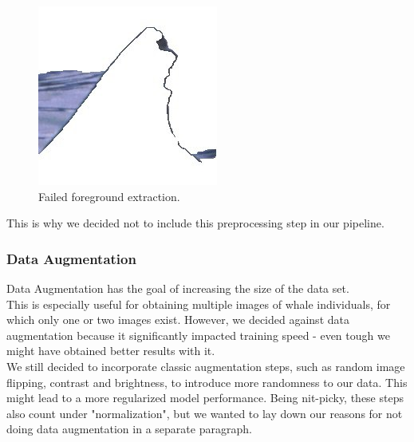 \begin{figure}[ht] 
        \centering \includegraphics[width=0.7\columnwidth]{figures/whack_foreground_extraction.jpg}
        \caption{\label{fig:fe} Failed foreground extraction.}
\end{figure}

\noindent This is why we decided not to include this preprocessing step in our pipeline.

\subsubsection{Data Augmentation}
Data Augmentation has the goal of increasing the size of the data set. \\
This is especially useful for obtaining multiple images of whale individuals, for which only one or two images exist. However, we decided against data augmentation because it significantly impacted training speed - even tough we might have obtained better results with it. \\
We still decided to incorporate classic augmentation steps, such as random image flipping, contrast and brightness, to introduce more randomness to our data. This might lead to a more regularized model performance. Being nit-picky, these steps also count under "normalization", but we wanted to lay down our reasons for not doing data augmentation in a separate paragraph.

